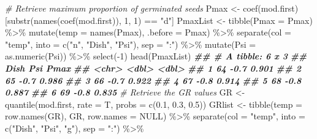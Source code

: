 \documentclass[
]{book}
\newenvironment{Shaded}{\begin{snugshade}}{\end{snugshade}}
\newcommand{\AttributeTok}[1]{\textcolor[rgb]{0.77,0.63,0.00}{#1}}
\newcommand{\CommentTok}[1]{\textcolor[rgb]{0.56,0.35,0.01}{\textit{#1}}}
\newcommand{\ConstantTok}[1]{\textcolor[rgb]{0.00,0.00,0.00}{#1}}
\newcommand{\DecValTok}[1]{\textcolor[rgb]{0.00,0.00,0.81}{#1}}
\newcommand{\DocumentationTok}[1]{\textcolor[rgb]{0.56,0.35,0.01}{\textbf{\textit{#1}}}}
\newcommand{\FloatTok}[1]{\textcolor[rgb]{0.00,0.00,0.81}{#1}}
\newcommand{\FunctionTok}[1]{\textcolor[rgb]{0.00,0.00,0.00}{#1}}
\newcommand{\NormalTok}[1]{#1}
\newcommand{\OtherTok}[1]{\textcolor[rgb]{0.56,0.35,0.01}{#1}}
\newcommand{\SpecialCharTok}[1]{\textcolor[rgb]{0.00,0.00,0.00}{#1}}
\newcommand{\StringTok}[1]{\textcolor[rgb]{0.31,0.60,0.02}{#1}}
\begin{document}
\begin{Shaded}
\begin{Highlighting}[]
\CommentTok{\# Retrieve maximum proportion of germinated seeds}
\NormalTok{Pmax }\OtherTok{\textless{}{-}} \FunctionTok{coef}\NormalTok{(mod.first)[}\FunctionTok{substr}\NormalTok{(}\FunctionTok{names}\NormalTok{(}\FunctionTok{coef}\NormalTok{(mod.first)), }\DecValTok{1}\NormalTok{, }\DecValTok{1}\NormalTok{) }\SpecialCharTok{==} \StringTok{"d"}\NormalTok{]}
\NormalTok{PmaxList }\OtherTok{\textless{}{-}} \FunctionTok{tibble}\NormalTok{(}\AttributeTok{Pmax =}\NormalTok{  Pmax) }\SpecialCharTok{\%\textgreater{}\%} 
  \FunctionTok{mutate}\NormalTok{(}\AttributeTok{temp =} \FunctionTok{names}\NormalTok{(Pmax), }\AttributeTok{.before =}\NormalTok{ Pmax) }\SpecialCharTok{\%\textgreater{}\%} 
  \FunctionTok{separate}\NormalTok{(}\AttributeTok{col =} \StringTok{"temp"}\NormalTok{, }\AttributeTok{into =} \FunctionTok{c}\NormalTok{(}\StringTok{"n"}\NormalTok{, }\StringTok{"Dish"}\NormalTok{, }\StringTok{"Psi"}\NormalTok{),}
           \AttributeTok{sep =} \StringTok{":"}\NormalTok{) }\SpecialCharTok{\%\textgreater{}\%} 
  \FunctionTok{mutate}\NormalTok{(}\AttributeTok{Psi =} \FunctionTok{as.numeric}\NormalTok{(Psi)) }\SpecialCharTok{\%\textgreater{}\%} 
  \FunctionTok{select}\NormalTok{(}\SpecialCharTok{{-}}\DecValTok{1}\NormalTok{)}
\FunctionTok{head}\NormalTok{(PmaxList)}
\DocumentationTok{\#\# \# A tibble: 6 x 3}
\DocumentationTok{\#\#   Dish    Psi  Pmax}
\DocumentationTok{\#\#   \textless{}chr\textgreater{} \textless{}dbl\textgreater{} \textless{}dbl\textgreater{}}
\DocumentationTok{\#\# 1 64     {-}0.7 0.901}
\DocumentationTok{\#\# 2 65     {-}0.7 0.986}
\DocumentationTok{\#\# 3 66     {-}0.7 0.922}
\DocumentationTok{\#\# 4 67     {-}0.8 0.914}
\DocumentationTok{\#\# 5 68     {-}0.8 0.887}
\DocumentationTok{\#\# 6 69     {-}0.8 0.835}
\CommentTok{\# Retrieve the GR values}
\NormalTok{GR }\OtherTok{\textless{}{-}} \FunctionTok{quantile}\NormalTok{(mod.first, }\AttributeTok{rate =}\NormalTok{ T, }\AttributeTok{probs =} \FunctionTok{c}\NormalTok{(}\FloatTok{0.1}\NormalTok{, }\FloatTok{0.3}\NormalTok{, }\FloatTok{0.5}\NormalTok{))}
\NormalTok{GRlist }\OtherTok{\textless{}{-}} \FunctionTok{tibble}\NormalTok{(}\AttributeTok{temp =} \FunctionTok{row.names}\NormalTok{(GR), GR, }\AttributeTok{row.names =} \ConstantTok{NULL}\NormalTok{) }\SpecialCharTok{\%\textgreater{}\%} 
  \FunctionTok{separate}\NormalTok{(}\AttributeTok{col =} \StringTok{"temp"}\NormalTok{, }\AttributeTok{into =} \FunctionTok{c}\NormalTok{(}\StringTok{"Dish"}\NormalTok{, }\StringTok{"Psi"}\NormalTok{, }\StringTok{"g"}\NormalTok{),}
           \AttributeTok{sep =} \StringTok{":"}\NormalTok{) }\SpecialCharTok{\%\textgreater{}\%} 

\end{Highlighting}
\end{Shaded}
\end{document}
